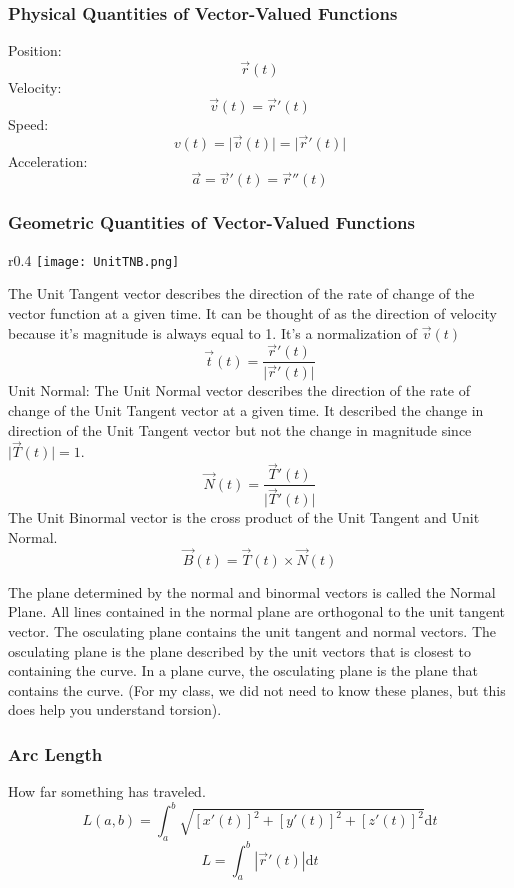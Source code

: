 \documentclass{article}
\begin{document}
\subsubsection{Physical Quantities of Vector-Valued Functions}
Position:
$$\vec{r}(t)$$
Velocity:
$$\vec{v}(t) = \vec{r}'(t)$$
Speed:
$$v(t) = \lvert \vec{v}(t) \rvert = \lvert \vec{r}'(t) \rvert$$
Acceleration:
$$\vec{a} = \vec{v}'(t) = \vec{r}''(t)$$

\subsubsection{Geometric Quantities of Vector-Valued Functions}
\begin{wrapfigure}{r}{0.4\textwidth}
    \texttt{[image: UnitTNB.png]}
    \label{fig:enter-label}
\end{wrapfigure}
The Unit Tangent vector describes the direction of the rate of change of the vector function at a given time. It can be thought of as the direction of velocity because it's magnitude is always equal to 1. It's a normalization of $\vec{v}(t)$
$$\vec{t}(t) = \frac{\vec{r}'(t)}{\lvert\vec{r}'(t)\rvert}$$
Unit Normal:
The Unit Normal vector describes the direction of the rate of change of the Unit Tangent vector at a given time. It described the change in direction of the Unit Tangent vector but not the change in magnitude since $\lvert\vec{T}(t)\rvert = 1$.
$$\vec{N}(t) = \frac{\vec{T}'(t)}{\lvert\vec{T}'(t)\rvert}$$
The Unit Binormal vector is the cross product of the Unit Tangent and Unit Normal. 
$$\vec{B}(t) = \vec{T}(t) \times \vec{N}(t)$$

The plane determined by the normal and binormal vectors is called the Normal Plane. All lines contained in the normal plane are orthogonal to the unit tangent vector. The osculating plane contains the unit tangent and normal vectors. The osculating plane is the plane described by the unit vectors that is closest to containing the curve. In a plane curve, the osculating plane is the plane that contains the curve. (For my class, we did not need to know these planes, but this does help you understand torsion). 

\subsubsection{Arc Length}
How far something has traveled. 
$$L(a,b) = \int_a^b{\sqrt{[x'(t)]^2+[y'(t)]^2+[z'(t)]^2}}\text{d}t$$
$$L=\int_a^b|\vec{r}'(t)|\text{d}t$$
\end{document}
